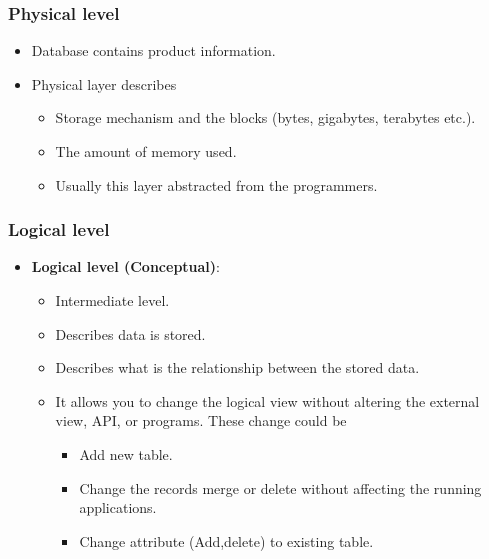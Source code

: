 \begin{frame}
	\frametitle{Physical level}
	\begin{example}		
		\begin{itemize}[<+->]
			\item Database contains product information.
			\item Physical layer describes
			\begin{itemize}[<+->]
				\item Storage mechanism and the blocks (bytes, gigabytes, terabytes etc.).
				\item The amount of memory used.
				\item Usually this layer abstracted from the programmers.
			\end{itemize}
		\end{itemize}
	\end{example}
	
\end{frame}
\begin{frame}
	\frametitle{Logical level}
	\begin{itemize}[<+->]
		\item \textbf{Logical level (Conceptual)}: 
		\begin{itemize}[<+->]
			\item Intermediate level.
			\item Describes \textbf{\underline{}} data is stored.
			\item Describes what is the relationship between the stored data.
			\item It allows you to change the logical view without altering the external view, API, or programs. These change could be
			\begin{itemize}[<+->]
				\item Add new table.
				\item Change the records merge or delete without affecting the running applications.
				\item Change attribute (Add,delete) to existing table.
			\end{itemize}									
		\end{itemize}		
	\end{itemize}	 
\end{frame}

